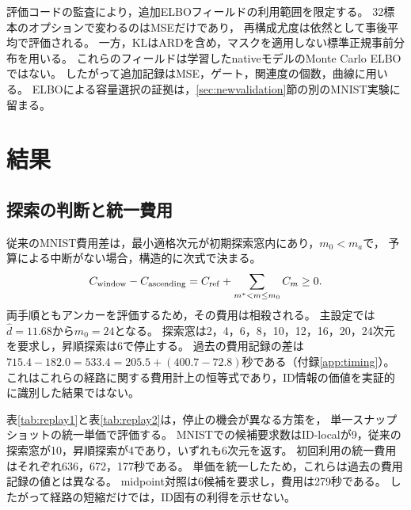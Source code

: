 \documentclass[11pt,a4paper]{ltjsarticle}
\begin{document}
評価コードの監査により，追加ELBOフィールドの利用範囲を限定する。
32標本のオプションで変わるのはMSEだけであり，
再構成尤度は依然として事後平均で評価される。
一方，KLはARDを含め，マスクを適用しない標準正規事前分布を用いる。
これらのフィールドは学習したnativeモデルのMonte Carlo ELBOではない。
したがって追加記録はMSE，ゲート，関連度の個数，曲線に用いる。
ELBOによる容量選択の証拠は，\ref{sec:newvalidation}節の別のMNIST実験に留まる。

\section{結果}\label{sec:results}

\subsection{探索の判断と統一費用}\label{sec:replayresults}
従来のMNIST費用差は，最小適格次元が初期探索窓内にあり，$m_0<m_a$で，
予算による中断がない場合，構造的に次式で決まる。
\begin{equation}
 C_{\rm window}-C_{\rm ascending}
 =C_{\rm ref}+\sum_{m^*<m\le m_0}C_m\ge0.
 \label{eq:dominance}
\end{equation}
両手順ともアンカーを評価するため，その費用は相殺される。
主設定では$\hat d=11.68$から$m_0=24$となる。
探索窓は2，4，6，8，10，12，16，20，24次元を要求し，昇順探索は6で停止する。
過去の費用記録の差は$715.4-182.0=533.4=205.5+(400.7-72.8)$秒である（付録\ref{app:timing}）。
これはこれらの経路に関する費用計上の恒等式であり，ID情報の価値を実証的に識別した結果ではない。

表\ref{tab:replay1}と表\ref{tab:replay2}は，停止の機会が異なる方策を，
単一スナップショットの統一単価で評価する。
MNISTでの候補要求数はID-localが9，従来の探索窓が10，昇順探索が4であり，いずれも6次元を返す。
初回利用の統一費用はそれぞれ636，672，177秒である。
単価を統一したため，これらは過去の費用記録の値とは異なる。
midpoint対照は6候補を要求し，費用は279秒である。
したがって経路の短縮だけでは，ID固有の利得を示せない。
\end{document}
